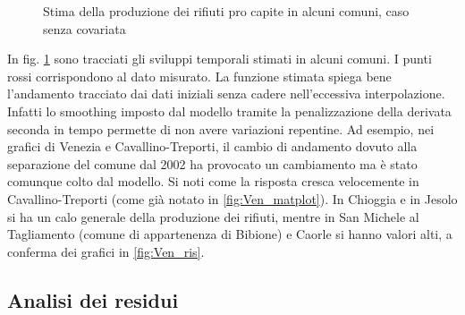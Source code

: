 \documentclass[a4paper,11pt,twoside,openright]{book}							%
\begin{document}
\begin{figure}[t]
{   }
	\caption{Stima della produzione dei rifiuti pro capite in alcuni comuni, caso senza covariata}
	\label{fig:Ven_tempo}
\end{figure}

In fig. \ref{fig:Ven_tempo} sono tracciati gli sviluppi temporali stimati in alcuni comuni. I punti rossi corrispondono al dato misurato. La funzione stimata spiega bene l'andamento tracciato dai dati iniziali senza cadere nell'eccessiva interpolazione. Infatti lo smoothing imposto dal modello tramite la penalizzazione della derivata seconda in tempo permette di non avere variazioni repentine. Ad esempio, nei grafici di Venezia e Cavallino-Treporti, il cambio di andamento dovuto alla separazione del comune dal 2002 ha provocato un cambiamento ma è stato comunque colto dal modello. Si noti come la risposta cresca velocemente in Cavallino-Treporti (come già notato in \ref{fig:Ven_matplot}). In Chioggia e in Jesolo si ha un calo generale della produzione dei rifiuti, mentre in San Michele al Tagliamento (comune di appartenenza di Bibione) e Caorle si hanno valori alti, a conferma dei grafici in \ref{fig:Ven_ris}.

\subsection{Analisi dei residui}
\end{document}
